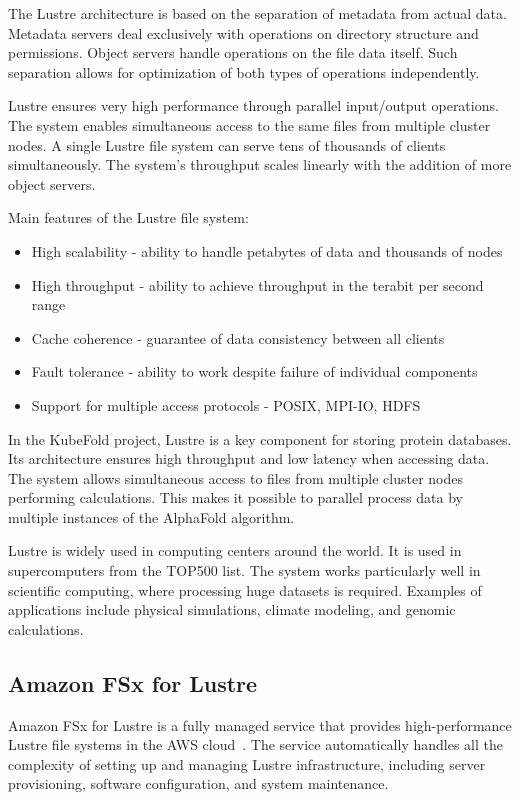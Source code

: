 The Lustre architecture is based on the separation of metadata from actual data.
Metadata servers deal exclusively with operations on directory structure and permissions.
Object servers handle operations on the file data itself.
Such separation allows for optimization of both types of operations independently.

Lustre ensures very high performance through parallel input/output operations.
The system enables simultaneous access to the same files from multiple cluster nodes.
A single Lustre file system can serve tens of thousands of clients simultaneously.
The system's throughput scales linearly with the addition of more object servers.

Main features of the Lustre file system:
\begin{itemize}
    \item High scalability - ability to handle petabytes of data and thousands of nodes
    \item High throughput - ability to achieve throughput in the terabit per second range
    \item Cache coherence - guarantee of data consistency between all clients
    \item Fault tolerance - ability to work despite failure of individual components
    \item Support for multiple access protocols - POSIX, MPI-IO, HDFS
\end{itemize}

In the KubeFold project, Lustre is a key component for storing protein databases.
Its architecture ensures high throughput and low latency when accessing data.
The system allows simultaneous access to files from multiple cluster nodes performing calculations.
This makes it possible to parallel process data by multiple instances of the AlphaFold algorithm.

Lustre is widely used in computing centers around the world.
It is used in supercomputers from the TOP500 list.
The system works particularly well in scientific computing, where processing huge datasets is required.
Examples of applications include physical simulations, climate modeling, and genomic calculations.

\subsection{Amazon FSx for Lustre}\label{subsec:amazon-fsx-for-lustre}

Amazon FSx for Lustre is a fully managed service that provides high-performance Lustre file systems in the AWS cloud~\cite{amazon_fsx}.
The service automatically handles all the complexity of setting up and managing Lustre infrastructure, including server provisioning, software configuration, and system maintenance.

